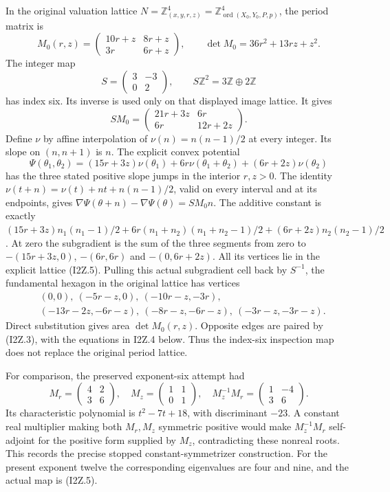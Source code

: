 In the original valuation lattice
\(N=\mathbb Z^4_{(x,y,r,z)}
=\mathbb Z^4_{\operatorname{ord}(X_0,Y_0,P,p)}\), the period matrix is
\[
 M_0(r,z)=
 \begin{pmatrix}10r+z&8r+z\\3r&6r+z\end{pmatrix},
 \qquad \det M_0=36r^2+13rz+z^2.
 \tag{I2Z.4}
\]
The integer map
\[
 S=\begin{pmatrix}3&-3\\0&2\end{pmatrix},\qquad
 S\mathbb Z^2=3\mathbb Z\oplus2\mathbb Z
 \tag{I2Z.5}
\]
has index six. Its inverse is used only on that displayed image lattice.
It gives
\[
 SM_0=
 \begin{pmatrix}21r+3z&6r\\6r&12r+2z\end{pmatrix}.
 \tag{I2Z.6}
\]
Define \(\nu\) by affine interpolation of
\(\nu(n)=n(n-1)/2\) at every integer. Its slope on \((n,n+1)\)
is \(n\). The explicit convex potential
\[
 \Psi(\theta_1,\theta_2)=
 (15r+3z)\nu(\theta_1)+6r\nu(\theta_1+\theta_2)
       +(6r+2z)\nu(\theta_2)
 \tag{I2Z.6a}
\]
has the three stated positive slope jumps in the interior \(r,z>0\).
The identity
\(\nu(t+n)=\nu(t)+nt+n(n-1)/2\), valid on every interval
and at its endpoints, gives
\(\nabla\Psi(\theta+n)-\nabla\Psi(\theta)=SM_0n\).
The additive constant is exactly
\((15r+3z)n_1(n_1-1)/2+
6r(n_1+n_2)(n_1+n_2-1)/2+
(6r+2z)n_2(n_2-1)/2\).
At zero the subgradient is the sum of the three segments from zero
to \(-(15r+3z,0)\), \(-(6r,6r)\) and \(-(0,6r+2z)\).
All its vertices lie in the explicit lattice (I2Z.5).
Pulling this actual subgradient cell back by \(S^{-1}\), the
fundamental hexagon in the original lattice has vertices
\[
\begin{aligned}
 &(0,0),\ (-5r-z,0),\ (-10r-z,-3r),\\
 &(-13r-2z,-6r-z),\ (-8r-z,-6r-z),\
 (-3r-z,-3r-z).
\end{aligned}
\tag{I2Z.7}
\]
Direct substitution gives area \(\det M_0(r,z)\). Opposite edges
are paired by (I2Z.3), with the equations in I2Z.4 below. Thus the
index-six inspection map does not replace the original period lattice.

For comparison, the preserved exponent-six attempt had
\[
 M_r=\begin{pmatrix}4&2\\3&6\end{pmatrix},\quad
 M_z=\begin{pmatrix}1&1\\0&1\end{pmatrix},\quad
 M_z^{-1}M_r=\begin{pmatrix}1&-4\\3&6\end{pmatrix}.
 \tag{I2Z.8}
\]
Its characteristic polynomial is \(t^2-7t+18\), with discriminant
\(-23\). A constant real multiplier making both \(M_r,M_z\)
symmetric positive would make \(M_z^{-1}M_r\) self-adjoint for the
positive form supplied by \(M_z\), contradicting these nonreal roots.
This records the precise stopped constant-symmetrizer construction.
For the present exponent twelve the corresponding eigenvalues are
four and nine, and the actual map is (I2Z.5).

